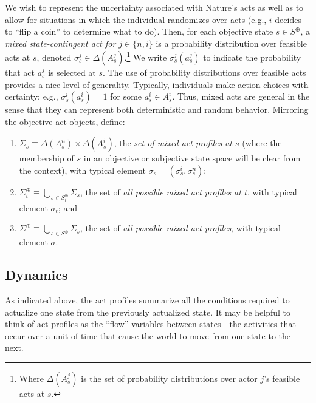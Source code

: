 \documentclass[
11pt,
titlepage,
reqno,
]{article}%
\theoremstyle{definition}
\begin{document}
 We wish to represent the uncertainty associated with Nature's acts as well as to allow for situations in which the individual randomizes over acts (e.g., $i$ decides to ``flip a coin'' to determine what to do).
 Then, for each objective state $s\in S^\oplus$, a \textit{mixed state-contingent act for $j\in\{n,i\}$} is a probability distribution over feasible acts at $s$, denoted $\sigma^j_s\in \Delta(A^j_{s})$.\footnote
 {
 	Where $\Delta(A^j_{s})$ is the set of probability distributions over actor $j$'s feasible acts at $s$. 
 } 
We write $\sigma^j_s(a^j_s)$ to indicate the probability that act $a^j_{s}$ is selected at $s$.
The use of probability distributions over feasible acts provides a nice level of generality.
Typically, individuals make action choices with certainty: e.g., $\sigma^i_s(a^i_s) =1$ for some $a^i_s\in A^i_s$.
Thus, mixed acts are general in the sense that they can represent both deterministic and random behavior.
Mirroring the objective act objects, define:
\begin{enumerate}
	\item $\Sigma_s\equiv \Delta(A^n_{s})\times\Delta(A^i_{s})$, the \textit{set of mixed act profiles at $s$} (where the membership of $s$ in an objective or subjective state space will be clear from the context), with typical element $\sigma_s=(\sigma^i_s,\sigma^n_s)$;
	\item $\Sigma^\oplus_t\equiv \bigcup_{s\in S^\oplus_t} \Sigma_s$, the set of \textit{all possible mixed act profiles at $t$}, with typical element $\sigma_t$; and
	\item $\Sigma^\oplus\equiv \bigcup_{s\in S^\oplus} \Sigma_s$, the set of \textit{all possible mixed act profiles}, with typical element $\sigma$.
\end{enumerate}

 
 
 
	
\subsection{Dynamics} 
	
As indicated above, the act profiles summarize all the conditions required to actualize one state from the previously actualized state. 	It may be helpful to think of act profiles as the ``flow'' variables between states---the activities that occur over a unit of time that cause the world to move from one state to the next.
	
\end{document}
